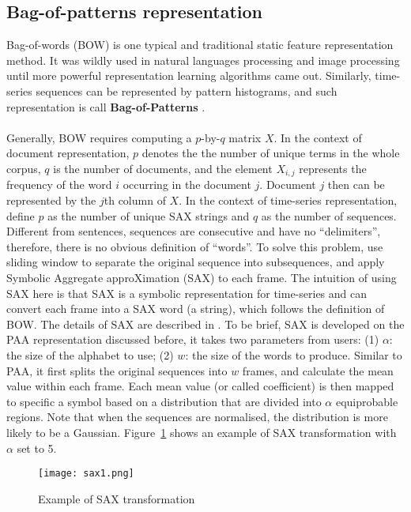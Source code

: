 \subsection{Bag-of-patterns representation}
Bag-of-words (BOW) is one typical and traditional static feature representation method. It was wildly used in natural languages processing and image processing until more powerful representation learning algorithms came out. Similarly, time-series sequences can be represented by pattern histograms, and such representation is call \textbf{Bag-of-Patterns} \cite{lin2012rotation}.\\
\\Generally, BOW requires computing a $p$-by-$q$ matrix $X$. In the context of document representation, $p$ denotes the the number of unique terms in the whole corpus, $q$ is the number of documents, and the element $X_{i,j}$ represents the frequency of the word $i$ occurring in the document $j$. Document $j$ then can be represented by the $j$th column of $X$. In the context of time-series representation, \cite{lin2012rotation} define $p$ as the number of unique SAX strings and $q$ as the number of sequences. Different from sentences, sequences are consecutive and have no ``delimiters'', therefore, there is no obvious definition of ``words''. To solve this problem, \cite{lin2012rotation} use sliding window to separate the original sequence into subsequences, and apply Symbolic Aggregate approXimation (SAX) to each frame. The intuition of using SAX here is that SAX is a symbolic representation for time-series and can convert each frame into a SAX word (a string), which follows the definition of BOW. The details of SAX are described in \cite{lin2007experiencing}. To be brief, SAX is developed on the PAA representation discussed before, it takes two parameters from users: (1) $\alpha$: the size of the alphabet to use; (2) $w$: the size of the words to produce. Similar to PAA, it first splits the original sequences into $w$ frames, and calculate the mean value within each frame. Each mean value (or called coefficient) is then mapped to specific a symbol based on a distribution that are divided into $\alpha$ equiprobable regions. Note that when the sequences are normalised, the distribution is more likely to be a Gaussian. Figure~\ref{fig:sax1} shows an example of SAX transformation with $\alpha$ set to 5. \\
\begin{figure}[!htbp]
    \centering
    \texttt{[image: sax1.png]}
    \caption{Example of SAX transformation}
    \label{fig:sax1}
\end{figure} 

